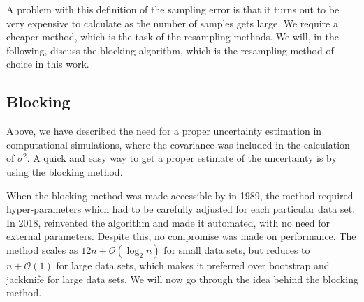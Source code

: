 A problem with this definition of the sampling error is that it turns out to be very expensive to calculate as the number of samples gets large. We require a cheaper method, which is the task of the resampling methods. We will, in the following, discuss the blocking algorithm, which is the resampling method of choice in this work. 

\subsection{Blocking}\label{sec:resampling}
Above, we have described the need for a proper uncertainty estimation in computational simulations, where the covariance was included in
the calculation of $\sigma^2$. A quick and easy way to get a proper estimate of the uncertainty is by using the blocking method.

When the blocking method was made accessible by \citet{flyvbjerg_error_1989} in 1989, the method required hyper-parameters which had to be carefully adjusted for each particular data set. In 2018, \citet{jonsson_standard_2018} reinvented the algorithm and made it automated, with no need for external parameters. Despite this, no compromise was made on performance. The method scales as $12n+\mathcal{O}(\log_2n)$ for small data sets, but reduces to $n+\mathcal{O}(1)$ for large data sets, which makes it preferred over bootstrap and jackknife for large data sets. We will now go through the idea behind the blocking method.

